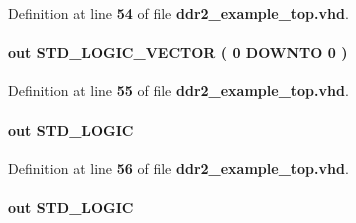 Definition at line {\bf 54} of file {\bf ddr2\+\_\+example\+\_\+top.\+vhd}.

\paragraph[{mem\+\_\+odt}]{ {\bfseries \textcolor{keywordflow}{out}\textcolor{vhdlchar}{ }} {\bfseries \textcolor{comment}{S\+T\+D\+\_\+\+L\+O\+G\+I\+C\+\_\+\+V\+E\+C\+T\+OR}\textcolor{vhdlchar}{ }\textcolor{vhdlchar}{(}\textcolor{vhdlchar}{ }\textcolor{vhdlchar}{ } \textcolor{vhdldigit}{0} \textcolor{vhdlchar}{ }\textcolor{keywordflow}{D\+O\+W\+N\+TO}\textcolor{vhdlchar}{ }\textcolor{vhdlchar}{ } \textcolor{vhdldigit}{0} \textcolor{vhdlchar}{ }\textcolor{vhdlchar}{)}\textcolor{vhdlchar}{ }} \hspace{0.3cm}{\ttfamily [Port]}}\label{classddr2__example__top_a95035645a864ed754fadafcc327d8193}


Definition at line {\bf 55} of file {\bf ddr2\+\_\+example\+\_\+top.\+vhd}.

\paragraph[{mem\+\_\+ras\+\_\+n}]{ {\bfseries \textcolor{keywordflow}{out}\textcolor{vhdlchar}{ }} {\bfseries \textcolor{comment}{S\+T\+D\+\_\+\+L\+O\+G\+IC}\textcolor{vhdlchar}{ }} \hspace{0.3cm}{\ttfamily [Port]}}\label{classddr2__example__top_a66af27d2b7e4e52023322398b6717931}


Definition at line {\bf 56} of file {\bf ddr2\+\_\+example\+\_\+top.\+vhd}.

\paragraph[{mem\+\_\+we\+\_\+n}]{ {\bfseries \textcolor{keywordflow}{out}\textcolor{vhdlchar}{ }} {\bfseries \textcolor{comment}{S\+T\+D\+\_\+\+L\+O\+G\+IC}\textcolor{vhdlchar}{ }} \hspace{0.3cm}{\ttfamily [Port]}}\label{classddr2__example__top_a35033f28d92e7fd56a7a75dc0a10004e}


